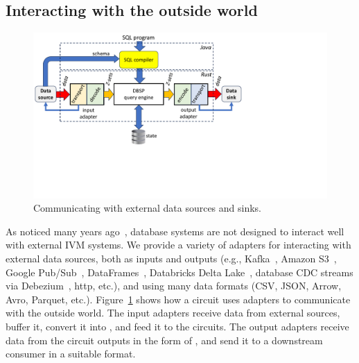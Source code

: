 \subsection{Interacting with the outside world}

\begin{figure}[h]
  \begin{center}
  \includegraphics[trim={0 2.2inin 3.7in 0},clip,scale=.33]{adapters.pdf}
  \caption{\label{fig:adapters}Communicating with external data
    sources and sinks.}
  \end{center}
\end{figure}

As noticed many years ago~\cite{labio-vldb00}, database
systems are not designed to interact well with external IVM systems.
We provide a variety of adapters for interacting with external data
sources, both as inputs and outputs (e.g., Kafka~\cite{kreps-netdb11},
Amazon S3~\cite{palankar-dadc08}, Google Pub/Sub~\cite{pubsub},
DataFrames~\cite{pandas12}, Databricks Delta
Lake~\cite{armbrust-vldb20}, database CDC streams via
Debezium~\cite{debezium}, http, etc.), and using many data formats
(CSV, JSON, Arrow, Avro, Parquet, etc.).  Figure~\ref{fig:adapters} shows how
a circuit uses adapters to communicate with the outside world.  The
input adapters receive data from external sources, buffer it, convert
it into \zrs, and feed it to the circuits.  The output adapters
receive data from the circuit outputs in the form of \zrs, and send it
to a downstream consumer in a suitable format.

